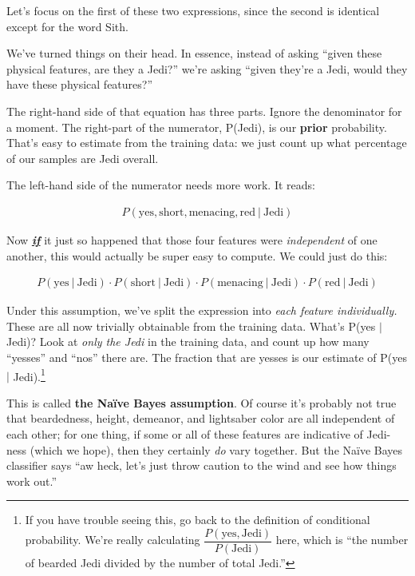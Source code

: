Let's focus on the first of these two expressions, since the second is
identical except for the word Sith.

We've turned things on their head. In essence, instead of asking ``given these
physical features, are they a Jedi?'' we're asking ``given they're a Jedi,
would they have these physical features?'' 

The right-hand side of that equation has three parts. Ignore the denominator
for a moment. The right-part of the numerator, P(Jedi), is our \textbf{prior}
probability. That's easy to estimate from the training data: we just count up
what percentage of our samples are Jedi overall.

The left-hand side of the numerator needs more work. It reads:

\vspace{-.2in}
\begin{align*}
P(\textrm{yes}, \textrm{short}, \textrm{menacing}, \textrm{red} \ | \ \textrm{Jedi}) 
\end{align*}

Now \textbf{\textit{\underline{if}}} it just so happened that those four
features were \textit{independent} of one another, this would actually be
super easy to compute. We could just do this:

\vspace{-.2in}
\begin{align*}
P(\textrm{yes} \ |\ \textrm{Jedi}) \cdot
P(\textrm{short} \ |\ \textrm{Jedi}) \cdot
P(\textrm{menacing} \ |\ \textrm{Jedi}) \cdot
P(\textrm{red} \ |\ \textrm{Jedi})
\end{align*}

Under this assumption, we've split the expression into \textit{each feature
individually.} These are all now trivially obtainable from the training data.
What's P(yes $|$ Jedi)? Look at \textit{only the Jedi} in the training data,
and count up how many ``yesses'' and ``nos'' there are. The fraction that are
yesses is our estimate of P(yes $|$ Jedi).\footnote{If you have trouble seeing
this, go back to the definition of conditional probability. We're really
calculating $\dfrac{P(\textrm{yes},\textrm{Jedi})}{P(\textrm{Jedi})}$ here,
which is ``the number of bearded Jedi divided by the number of total Jedi.''}

This is called \textbf{the Na\"{i}ve Bayes assumption}. Of course it's probably
not true that beardedness, height, demeanor, and lightsaber color are all
independent of each other; for one thing, if some or all of these features are
indicative of Jedi-ness (which we hope), then they certainly \textit{do} vary
together. But the Na\"{i}ve Bayes classifier says ``aw heck, let's just throw
caution to the wind and see how things work out.''

